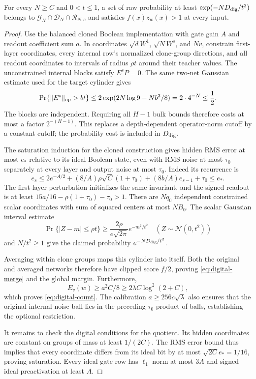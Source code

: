 \begin{lemma}\label{lem:digital-cylinder}
For every $N\ge C$ and $0<t\le1$, a set of raw probability at least
$\exp(-ND_{\rm dig}/t^2)$ belongs to
$\mathcal G_N\cap\mathcal D_N\cap\mathcal R_{N,c}$ and satisfies
$f(x)z_w(x)>1$ at every input.
\end{lemma}
\begin{proof}
Use the balanced cloned Boolean implementation with gate gain $A$ and
readout coefficient sum $a$.  In coordinates
$\sqrt d W^1$, $\sqrt N W^s$, and $Nv$, constrain first-layer coordinates,
every internal row's normalized clone-group directions, and all readout
coordinates to intervals of radius $\rho t$ around their teacher values.
The unconstrained internal blocks satisfy $E^sP=0$.  The same two-net
Gaussian estimate used for the target cylinder gives
\[
 \Pr\{\|E^s\|_{\rm op}>bt\}
 \le2\exp(2N\log9-Nb^2/8)=2\cdot4^{-N}\le\frac12.
\]
The blocks are independent.  Requiring all $H-1$ bulk bounds therefore
costs at most a factor $2^{-(H-1)}$.  This replaces a depth-dependent
operator-norm cutoff by a constant cutoff; the probability cost is
included in $D_{\rm dig}$.

The saturation induction for the cloned construction gives hidden RMS
error at most $e_*$ relative to its ideal Boolean state, even with RMS
noise at most $\tau_0$ separately at every layer and output noise at most
$\tau_0$.  Indeed its recurrence is
\[
 e_s\le 2e^{-A/2}+(8/A)\rho\sqrt C(1+\tau_0)
                 +(8b/A)e_{s-1}+\tau_0\le e_*.
\]
The first-layer perturbation initializes the same invariant, and the
signed readout is at least
$15a/16-\rho(1+\tau_0)-\tau_0>1$.
There are $Nq_0$ independent constrained scalar coordinates with sum of
squared centers at most $NB_0$.  The scalar Gaussian interval estimate
\[
 \Pr\{|Z-m|\le\rho t\}
 \ge\frac{2\rho}{e\sqrt{2\pi}}e^{-m^2/t^2}
 \quad (Z\sim\mathcal N(0,t^2))
\]
and $N/t^2\ge1$ give the claimed probability $e^{-ND_{\rm dig}/t^2}$.

Averaging within clone groups maps this cylinder into itself.  Both the
original and averaged networks therefore have clipped score $f/2$,
proving \eqref{eq:digital-merge} and the global margin.
Furthermore,
\[
 E_v(w)\ge a^2C/8\ge2\lambda C\log^2(2+C),
\]
which proves \eqref{eq:digital-count}.  The calibration $a\ge256c\sqrt\lambda$
also ensures that the original internal-noise ball lies in the preceding
$\tau_0$ product of balls, establishing the optional restriction.

It remains to check the digital conditions for the quotient.  Its hidden
coordinates are constant on groups of mass at least $1/(2C)$.  The RMS
error bound thus implies that every coordinate differs from its ideal
bit by at most $\sqrt{2C}e_*=1/16$, proving saturation.
Every ideal gate row has $\ell_1$ norm at most $3A$ and signed ideal
preactivation at least $A$.


\end{proof}
